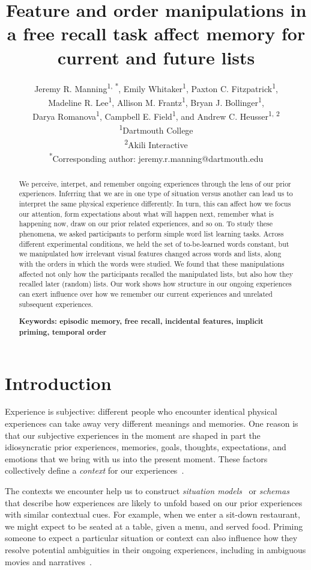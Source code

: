 \documentclass[11pt]{article}
\title{\Large Feature and order manipulations in a free recall task affect memory for current and future lists}
\author{Jeremy R. Manning\textsuperscript{1, *}, Emily
Whitaker\textsuperscript{1}, Paxton C. Fitzpatrick\textsuperscript{1},
\\Madeline R. Lee\textsuperscript{1}, Allison M. Frantz\textsuperscript{1},
Bryan J. Bollinger\textsuperscript{1},\\Darya Romanova\textsuperscript{1},
Campbell E. Field\textsuperscript{1}, and Andrew C. Heusser\textsuperscript{1,
2}\\\textsuperscript{1}Dartmouth College\\\textsuperscript{2}Akili
Interactive\\\textsuperscript{*}Corresponding author:
jeremy.r.manning@dartmouth.edu}
\date{}
\begin{document}
\maketitle

\begin{abstract} \footnotesize{We perceive, interpet, and remember ongoing
experiences through the lens of our prior experiences. Inferring that we are in
one type of situation versus another can lead us to interpret the same physical
experience differently. In turn, this can affect how we focus our attention,
form expectations about what will happen next, remember what is happening now,
draw on our prior related experiences, and so on. To study these phenomena, we
asked participants to perform simple word list learning tasks. Across different
experimental conditions, we held the set of to-be-learned words constant, but
we manipulated how irrelevant visual features changed across words and lists,
along with the orders in which the words were studied. We found that these
manipulations affected not only how the participants recalled the manipulated
lists, but also how they recalled later (random) lists. Our work shows how
structure in our ongoing experiences can exert influence over how we remember
our current experiences and unrelated subsequent experiences.

\textbf{Keywords: episodic memory, free recall, incidental features, implicit priming, temporal order}}

\end{abstract}


\section*{Introduction}


Experience is subjective: different people who encounter identical physical
experiences can take away very different meanings and memories. One reason is
that our subjective experiences in the moment are shaped in part the
idiosyncratic prior experiences, memories, goals, thoughts, expectations, and
emotions that we bring with us into the present moment. These factors
collectively define a \textit{context} for our experiences~\citep{Mann20}. 


The contexts we encounter help us to construct \textit{situation
models}~\citep{RangRitc12, MannEtal15, RadvCope06, ZwaaEtal95} or
\textit{schemas}~\citep{MasiEtal22, BaldEtal18} that describe how experiences
are likely to unfold based on our prior experiences with similar contextual
cues. For example, when we enter a sit-down restaurant, we might expect to be
seated at a table, given a menu, and served food. Priming someone to expect a
particular situation or context can also influence how they resolve potential
ambiguities in their ongoing experiences, including in ambiguous movies and
narratives~\citep{YeshEtal17}.
\end{document}
